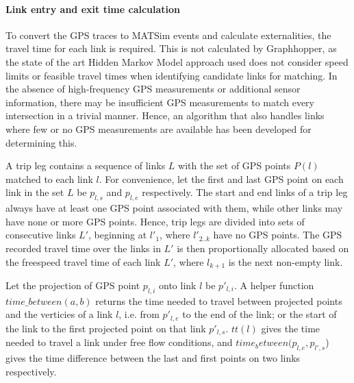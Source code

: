 \paragraph{Link entry and exit time calculation}
To convert the GPS traces to MATSim events and calculate externalities, the travel time for each link is required.
This is not calculated by Graphhopper, as the state of the art Hidden Markov Model approach used \citep{newson2009hidden} does not consider speed limits or feasible travel times when identifying candidate links for matching.
In the absence of high-frequency GPS measurements or additional sensor information, there may be insufficient GPS measurements to match every intersection in a trivial manner.
Hence, an algorithm that also handles links where few or no GPS measurements are available has been developed for determining this.

A trip leg contains a sequence of links $L$ with the set of GPS points $P(l)$ matched to each link $l$.
For convenience, let the first and last GPS point on each link in the set $L$ be $p_{l,s}$ and $p_{l,e}$ respectively.
The start and end links of a trip leg always have at least one GPS point associated with them, while other links may have none or more GPS points.
Hence, trip legs are divided into sets of consecutive links  $L'$, beginning at $l'_1$,  where $l'_{2..k}$ have no GPS points.
The GPS recorded travel time over the links in $L'$ is then proportionally allocated based on the freespeed travel time of each link $L'$, where $l_{k+1}$ is the next non-empty link.

Let the projection of GPS point $p_{l,i}$ onto link $l$ be $p'_{l,i}$.
A helper function $time\_between(a,b)$ returns the time needed to travel between projected points and the verticies of a link $l$, i.e. from $p'_{l,e}$ to the end of the link; or the start of the link to the first projected point on that link $p'_{l,s}$.
$tt(l)$ gives the time needed to travel a link under free flow conditions, and $time_between(p_{l,e}, p_{l',s}$) gives the time difference between the last and first points on two links respectively.

